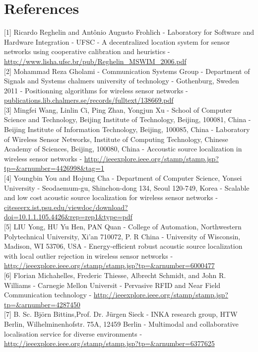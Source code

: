 \documentclass[a4paper,10pt]{article}
\begin{document}
\section{References}
[1]
Ricardo Reghelin and Antônio Augusto Frohlich -
Laboratory for Software and Hardware Integration - UFSC -  
A decentralized location system for sensor networks using cooperative calibration and heuristics -
\url{http://www.lisha.ufsc.br/pub/Reghelin_MSWIM_2006.pdf}\\
{[2]}
Mohammad Reza Gholami -
Communication Systems Group - Department of Signals and Systems chalmers university of technology - Gothenburg, Sweden 2011 -
Positionning algorithms for wireless sensor networks -
\url{publications.lib.chalmers.se/records/fulltext/138669.pdf} \\
{[3]}
Mingfei Wang, Linlin Ci, Ping Zhan, Yongjun Xu -
School of Computer Science and Technology, Beijing Institute of Technology, Beijing, 100081, China -
Beijing Institute of Information Technology, Beijing, 100085, China -
Laboratory of Wireless Sensor Networks, Institute of Computing Technology, Chinese Academy of Sciences, Beijing, 100080, China -
Accoustic source localization in wireless sensor networks - 
\url{http://ieeexplore.ieee.org/stamp/stamp.jsp?tp=&arnumber=4426998&tag=1}\\
{[4]}
Youngbin You and Hojung Cha - 
Department of Computer Science, Yonsei University - 
Seodaemum-gu, Shinchon-dong 134, Seoul 120-749, Korea -
Scalable and low cost acoustic source localization for wireless sensor networks - 
\url{citeseerx.ist.psu.edu/viewdoc/download?doi=10.1.1.105.4426&rep=rep1&type=pdf}\\
{[5]}
LIU Yong, HU Yu Hen, PAN Quan - College of Automation, Northwestern Polytechnical University, Xi’an 710072, P. R China -
University of Wisconsin, Madison, WI 53706, USA -
Energy-efficient robust acoustic source localization with local outlier rejection in wireless sensor networks -
\url{http://ieeexplore.ieee.org/stamp/stamp.jsp?tp=&arnumber=6000477}\\
{[6]}
Florian Michahelles, Frederic Thiesse, Albrecht Schmidt, and John R. Williams - 
Carnegie Mellon Universit - 
Pervasive RFID and Near Field Communication technology - 
\url{http://ieeexplore.ieee.org/stamp/stamp.jsp?tp=&arnumber=4287450}\\
{[7]}
B. Sc. Björn Bittins,Prof. Dr. Jürgen Sieck -
INKA research group, HTW Berlin, Wilhelminenhofstr. 75A, 12459 Berlin - 
Multimodal and collaborative localisation service for diverse environments - 
\url{http://ieeexplore.ieee.org/stamp/stamp.jsp?tp=&arnumber=6377625}\\
\end{document}
